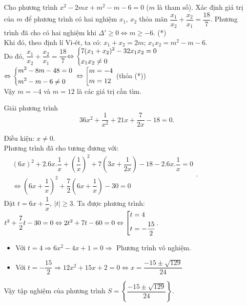    \begin{bt}%
   	Cho phương trình $x^2-2mx+m^2-m-6=0$ ($m$ là tham số). Xác định giá trị của $m$ để phương trình có hai nghiệm $x_1$, $x_2$ thỏa mãn $\dfrac{x_1}{x_2}+\dfrac{x_2}{x_1}=\dfrac{18}{7}$.
   	\loigiai
   	{
   		Phương trình đã cho có hai nghiệm khi ${\Delta }'\ge 0\Leftrightarrow m\ge -6$.  (*)\\
   		Khi đó, theo định lí Vi-ét, ta có: $x_1+x_2=2m$; $x_1x_2=m^2-m-6$.\\	
   		Do đó, $\dfrac{x_1}{x_2}+\dfrac{x_2}{x_1}=\dfrac{18}{7}$$\Leftrightarrow \left\{\begin{aligned}
   			& 7( x_1+x_2)^2-32x_1x_2=0 \\
   			& x_1x_2\ne 0\end{aligned}\right.$	\\
   		$\Leftrightarrow \left\{\begin{aligned}
   			& m^2-8m-48=0 \\
   			& m^2-m-6\ne 0\end{aligned}\right.$	
   		$\Leftrightarrow \left[\begin{aligned}
   			& m=-4 \\
   			& m=12\end{aligned}\right.$ (thỏa (*))\\	
   		Vậy $m=-4$ và $m=12$ là các giá trị cần tìm.		
   	}
   \end{bt}
   \begin{bt}%
   	Giải phương trình $$36x^2+\dfrac{1}{x^2}+21x+\dfrac{7}{2x}-18=0.$$
   	\loigiai
   	{Điều kiện: $x\ne 0$.\\
   		Phương trình đã cho tương đương với:\\
   		$\begin{aligned}
   		&(6x)^2+2.6x.\dfrac{1}{x}+\left(\dfrac{1}{x}\right)^2+7\left(3x+\dfrac{1}{2x}\right)-18-2.6x.\dfrac{1}{x}=0\\&
   		\Leftrightarrow \left(6x+\dfrac{1}{x}\right)^2+\dfrac{7}{2}\left(6x+\dfrac{1}{x}\right)-30=0
   		\end{aligned}
   		$.\\
   		Đặt $t=6x+\dfrac{1}{x},\ \left|t\right|\ge 3$. Ta được phương trình:\\
   		$t^2+\dfrac{7}{2}t-30=0\Leftrightarrow 2t^2+7t-60=0\Leftrightarrow \left[\begin{aligned}&t=4\\&t=-\dfrac{15}{2}\end{aligned}\right.$.
   		\begin{itemize}
   			\item Với $t=4\Rightarrow 6x^2-4x+1=0\Rightarrow $ Phương trình vô nghiệm.
   			\item Với $t=-\dfrac{15}{2}\Rightarrow 12x^2+15x+2=0\Leftrightarrow x=\dfrac{-15\pm \sqrt{129}}{24}$
   		\end{itemize} 
   		Vậy tập nghiệm của phương trình $S=\left\{\dfrac{-15\pm \sqrt{129}}{24}\right\}$.
   	}
   \end{bt}
